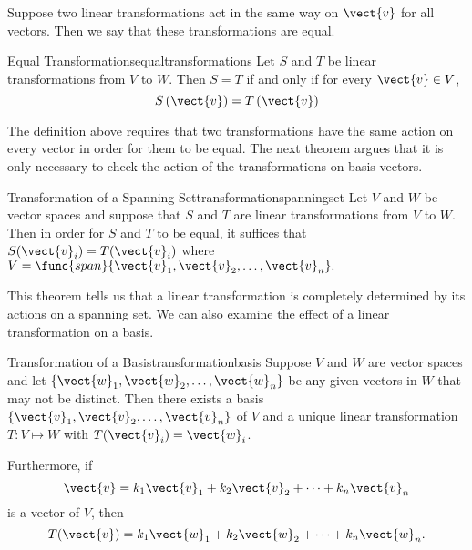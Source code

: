 Suppose two linear transformations act in the same way on $\vect{v}$ for all vectors. Then we say that these transformations are equal.

\begin{definition}{Equal Transformations}{equaltransformations}
Let $S$ and $T$ be linear transformations from $V$ to $W$. Then $S = T$ if and only if for every $\vect{v} \in V$, 
\[
S \left( \vect{v} \right) = T \left( \vect{v} \right)
\]
\end{definition}

The definition above requires that two transformations have the same action on every vector in order for them to be equal. The next theorem argues that it is only necessary to check the action of the transformations on basis vectors.

\begin{theorem}{Transformation of a Spanning Set}{transformationspanningset}
Let $V$ and $W$ be vector spaces and suppose that $S$ and $T$ are linear transformations from $V$ to $W$. Then in order for $S$ and $T$ to be equal, it suffices that $S(\vect{v}_i) = T(\vect{v}_i)$ where $V=\func{span} \{ \vect{v}_1, \vect{v}_2, \ldots, \vect{v}_n\}.$
\end{theorem}

This theorem tells us that a linear transformation is completely
determined by its actions on a spanning set. We can also examine the effect of a linear transformation on a basis.

\begin{theorem}{Transformation of a Basis}{transformationbasis}
Suppose $V$ and $W$ are vector spaces and let $\{ \vect{w}_1, \vect{w}_2, \ldots, \vect{w}_n\}$ be any given vectors in $W$ that may not be distinct. Then there exists a basis $\{ \vect{v}_1, \vect{v}_2, \ldots, \vect{v}_n\}$ of $V$ and a unique linear transformation $T: V \mapsto W$ with $T (\vect{v}_i) = \vect{w}_i$.

Furthermore, if 
\[ \vect{v} = k_1\vect{v}_1+k_2\vect{v}_2+ \cdots+ k_n\vect{v}_n\]
is a vector of $V$, then
\[ T(\vect{v}) = k_1\vect{w}_1+k_2\vect{w}_2+ \cdots+ k_n\vect{w}_n.\]
\end{theorem}
